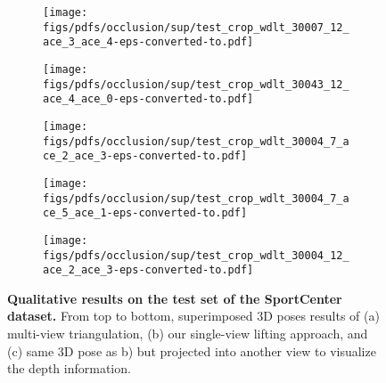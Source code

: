 \documentclass[runningheads]{llncs}
\begin{document}
\begin{figure*}[t!]
\begin{subfigure}[b]{0.16\linewidth}
    \end{subfigure}
    \begin{subfigure}[b]{0.16\linewidth}        \centering
        \texttt{[image: figs/pdfs/occlusion/sup/test\_crop\_wdlt\_30007\_12\_ace\_3\_ace\_4-eps-converted-to.pdf]}
    \end{subfigure}
    \begin{subfigure}[b]{0.16\linewidth}        \centering
        \texttt{[image: figs/pdfs/occlusion/sup/test\_crop\_wdlt\_30043\_12\_ace\_4\_ace\_0-eps-converted-to.pdf]}
    \end{subfigure}
    \begin{subfigure}[b]{0.16\linewidth}        \centering
        \texttt{[image: figs/pdfs/occlusion/sup/test\_crop\_wdlt\_30004\_7\_ace\_2\_ace\_3-eps-converted-to.pdf]}
    \end{subfigure}
    \begin{subfigure}[b]{0.16\linewidth}        \centering
        \texttt{[image: figs/pdfs/occlusion/sup/test\_crop\_wdlt\_30004\_7\_ace\_5\_ace\_1-eps-converted-to.pdf]}
    \end{subfigure}
    \begin{subfigure}[b]{0.16\linewidth}        \centering
        \texttt{[image: figs/pdfs/occlusion/sup/test\_crop\_wdlt\_30004\_12\_ace\_2\_ace\_3-eps-converted-to.pdf]}
    \end{subfigure}
    
            
    \caption{\small \textbf{Qualitative results on the test set of the SportCenter dataset.} From top to bottom, superimposed 3D poses results of (a) multi-view triangulation, (b) our single-view lifting approach, and (c) same 3D pose as b) but projected into another view to visualize the depth information.}
    \label{fig:visuals_sc_sup}
\end{figure*}
\end{document}
